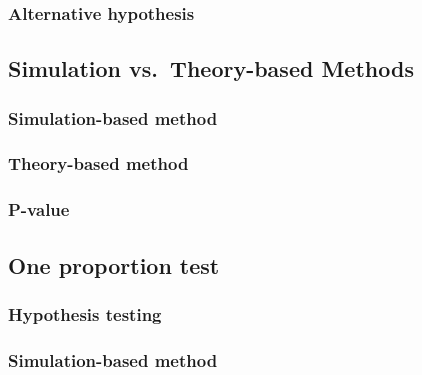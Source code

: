 \documentclass[
]{report}
\begin{document}
\subsubsection*{Alternative hypothesis}\label{alternative-hypothesis}

\subsection*{Simulation vs.~Theory-based Methods}\label{simulation-vs.-theory-based-methods}

\subsubsection*{Simulation-based method}\label{simulation-based-method}

\subsubsection*{Theory-based method}\label{theory-based-method}

\subsubsection*{P-value}\label{p-value}

\subsection*{One proportion test}\label{one-proportion-test}

\subsubsection*{Hypothesis testing}\label{hypothesis-testing}

\subsubsection*{Simulation-based method}\label{simulation-based-method-1}
\end{document}
